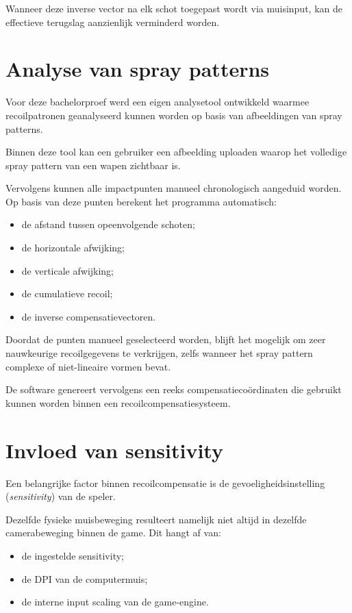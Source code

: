 Wanneer deze inverse vector na elk schot toegepast wordt via muisinput, kan de effectieve terugslag aanzienlijk verminderd worden.

\section{Analyse van spray patterns}

Voor deze bachelorproef werd een eigen analysetool ontwikkeld waarmee recoilpatronen geanalyseerd kunnen worden op basis van afbeeldingen van spray patterns.

Binnen deze tool kan een gebruiker een afbeelding uploaden waarop het volledige spray pattern van een wapen zichtbaar is.

Vervolgens kunnen alle impactpunten manueel chronologisch aangeduid worden. Op basis van deze punten berekent het programma automatisch:

\begin{itemize}
    \item de afstand tussen opeenvolgende schoten;
    \item de horizontale afwijking;
    \item de verticale afwijking;
    \item de cumulatieve recoil;
    \item de inverse compensatievectoren.
\end{itemize}

Doordat de punten manueel geselecteerd worden, blijft het mogelijk om zeer nauwkeurige recoilgegevens te verkrijgen, zelfs wanneer het spray pattern complexe of niet-lineaire vormen bevat.

De software genereert vervolgens een reeks compensatiecoördinaten die gebruikt kunnen worden binnen een recoilcompensatiesysteem.
\newpage
\section{Invloed van sensitivity}

Een belangrijke factor binnen recoilcompensatie is de gevoeligheidsinstelling (\textit{sensitivity}) van de speler.

Dezelfde fysieke muisbeweging resulteert namelijk niet altijd in dezelfde camerabeweging binnen de game. Dit hangt af van:
\begin{itemize}
    \item de ingestelde sensitivity;
    \item de DPI van de computermuis;
    \item de interne input scaling van de game-engine.
\end{itemize}

